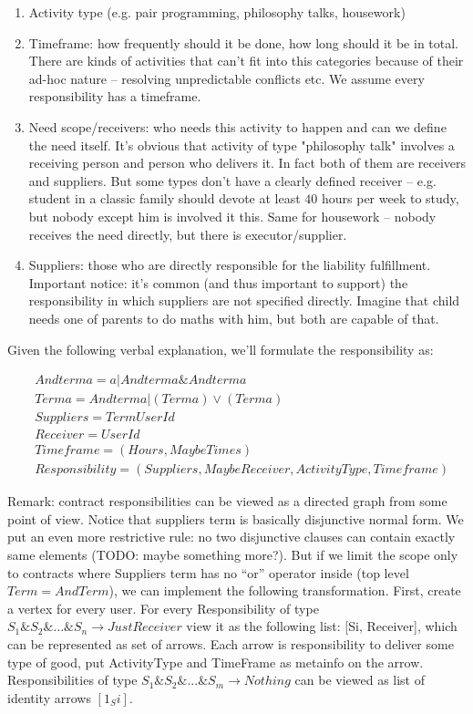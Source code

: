 \documentclass[]{itmo-student-thesis}
\begin{document}
\begin{enumerate}

\item Activity type (e.g. pair programming, philosophy talks,
  housework)

\item Timeframe: how frequently should it be done, how long should it
  be in total. There are kinds of activities that can’t fit into this
  categories because of their ad-hoc nature -- resolving unpredictable
  conflicts etc. We assume every responsibility has a timeframe.

\item Need scope/receivers: who needs this activity to happen and can
  we define the need itself. It’s obvious that activity of type
  "philosophy talk" involves a receiving person and person who
  delivers it. In fact both of them are receivers and suppliers. But
  some types don’t have a clearly defined receiver -- e.g. student in
  a classic family should devote at least $40$ hours per week to
  study, but nobody except him is involved it this. Same for housework
  -- nobody receives the need directly, but there is
  executor/supplier.

\item Suppliers: those who are directly responsible for the liability
  fulfillment. Important notice: it’s common (and thus important to
  support) the responsibility in which suppliers are not specified
  directly. Imagine that child needs one of parents to do maths with
  him, but both are capable of that.

\end{enumerate}

Given the following verbal explanation, we’ll formulate the responsibility as:

\begin{align*}
&Andterm a = a | Andterm a \& Andterm a \\
&Term a = Andterm a | (Term a) \vee (Term a) \\
&Suppliers = Term UserId\\
&Receiver = UserId\\
&Timeframe = (Hours, Maybe Times)\\
&Responsibility = (Suppliers, Maybe Receiver, ActivityType, Timeframe)
\end{align*}

Remark: contract responsibilities can be viewed as a directed graph
from some point of view. Notice that suppliers term is basically
disjunctive normal form. We put an even more restrictive rule: no two
disjunctive clauses can contain exactly same elements (TODO: maybe
something more?). But if we limit the scope only to contracts where
Suppliers term has no “or” operator inside (top level $Term =
AndTerm$), we can implement the following transformation. First,
create a vertex for every user. For every Responsibility of type
$S_1\&S_2\&…\&S_n \rightarrow Just Receiver$ view it as the following
list: [Si, Receiver], which can be represented as set of arrows. Each
arrow is responsibility to deliver some type of good, put ActivityType
and TimeFrame as metainfo on the arrow. Responsibilities of type
$S_1\&S_2\&...\&S_m \rightarrow Nothing$ can be viewed as list of
identity arrows $[1_Si]$.
\end{document}
